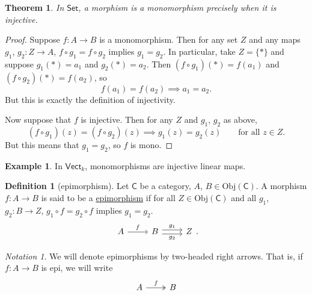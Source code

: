 \documentclass[a4paper]{report}
\newcommand{\defn}[1]{\ul{#1}}
\newcommand{\Obj}{\mathrm{Obj}}
\theoremstyle{definition}
\newtheorem{definition}{Definition}[section]
\newtheorem{example}{Example}[section]
\theoremstyle{plain}
\newtheorem{theorem}{Theorem}[section]
\theoremstyle{remark}
\newtheorem{notation}{Notation}[section]
\begin{document}
\begin{theorem}
  In $\mathsf{Set}$, a morphism is a monomorphism precisely when it is injective.
\end{theorem}
\begin{proof}
  Suppose $f\colon A \to B$ is a monomorphism. Then for any set $Z$ and any maps $g_{1}$, $g_{2}\colon Z \to A$, $f \circ g_{1} = f \circ g_{2}$ implies $g_{1} = g_{2}$. In particular, take $Z = \{*\}$ and suppose $g_{1}(*) = a_{1}$ and $g_{2}(*) = a_{2}$. Then $(f \circ g_{1})(*) = f(a_{1})$ and $(f \circ g_{2})(*) = f(a_{2})$, so
  \begin{equation*}
    f(a_{1}) = f(a_{2}) \implies a_{1} = a_{2}.
  \end{equation*}
  But this is exactly the definition of injectivity.

  Now suppose that $f$ is injective. Then for any $Z$ and $g_{1}$, $g_{2}$ as above,
  \begin{equation*}
    (f \circ g_{1})(z) = (f \circ g_{2})(z) \implies g_{1}(z) = g_{2}(z)\qquad\text{for all } z \in Z.
  \end{equation*}
  But this means that $g_{1} = g_{2}$, so $f$ is mono.
\end{proof}

\begin{example}
  \label{eg:monomorphismsinkvect}
  In $\mathsf{Vect}_{k}$, monomorphisms are injective linear maps.
\end{example}

\begin{definition}[epimorphism]
  \label{def:epimorphism}
  Let $\mathsf{C}$ be a category, $A$, $B\in \Obj(\mathsf{C})$. A morphism $f\colon A \to B$ is said to be a \defn{epimorphism} if for all $Z \in \Obj(\mathsf{C})$ and all $g_{1}$, $g_{2}\colon B \to Z$, $g_{1} \circ f = g_{2}\circ f$ implies $g_{1} = g_{2}$.
  \begin{equation*}
    \begin{tikzcd}
      A \arrow[r, "f"] & B \arrow[r, shift left, "g_{1}"] \arrow[r, shift right, swap, "g_{2}"] & Z
    \end{tikzcd}.
  \end{equation*}
\end{definition}

\begin{notation}
  We will denote epimorphisms by two-headed right arrows. That is, if $f\colon A \to B$ is epi, we will write
  \begin{equation*}
    \begin{tikzcd}
      A
      \arrow[r, twoheadrightarrow, "f"]
      & B
    \end{tikzcd}
  \end{equation*}
\end{notation}
\end{document}
